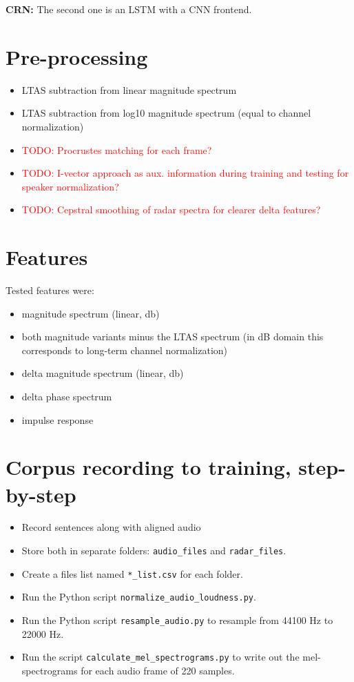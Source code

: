 \documentclass{article}
\begin{document}
\textbf{CRN:} The second one is an LSTM with a CNN frontend.

\section{Pre-processing}

\begin{itemize}
\item LTAS subtraction from linear magnitude spectrum
\item LTAS subtraction from log10 magnitude spectrum (equal to channel normalization)
\item \textcolor{red}{TODO: Procrustes matching for each frame?}
\item \textcolor{red}{TODO: I-vector approach as aux. information during training and testing for speaker normalization?}
\item \textcolor{red}{TODO: Cepstral smoothing of radar spectra for clearer delta features?}
\end{itemize}

\section{Features}
Tested features were:

\begin{itemize}
\item magnitude spectrum (linear, db)
\item both magnitude variants minus the LTAS spectrum (in dB domain this corresponds to long-term channel normalization)
\item delta magnitude spectrum (linear, db)
\item delta phase spectrum
\item impulse response
\end{itemize}

\section{Corpus recording to training, step-by-step}
\begin{itemize}
\item Record sentences along with aligned audio
\item Store both in separate folders: \texttt{audio\_files} and \texttt{radar\_files}. 
\item Create a files list named \texttt{*\_list.csv} for each folder.
\item Run the Python script \texttt{normalize\_audio\_loudness.py}.
\item Run the Python script \texttt{resample\_audio.py} to resample from 44100 Hz to 22000 Hz.
\item Run the script \texttt{calculate\_mel\_spectrograms.py} to write out the mel-spectrograms for each audio frame of 220 samples.
\end{itemize}
\end{document}
